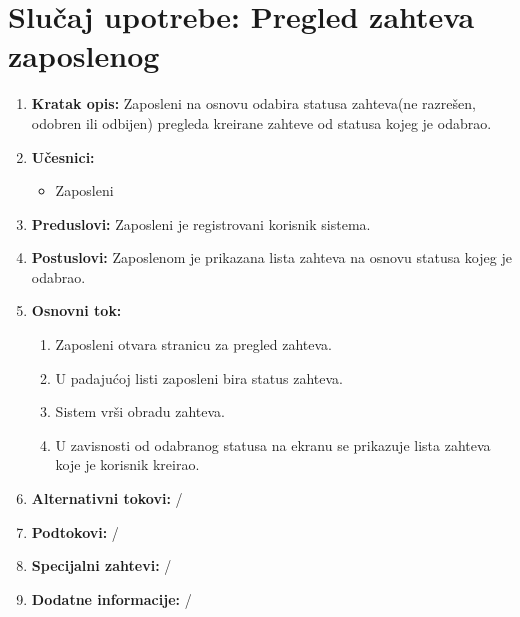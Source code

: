 \documentclass[a4paper]{article}
\begin{document}
\section{Slučaj upotrebe: Pregled zahteva zaposlenog}
\begin{enumerate}
    \item \textbf{Kratak opis:} Zaposleni na osnovu odabira statusa zahteva(ne razrešen, odobren ili odbijen) pregleda kreirane zahteve od statusa kojeg je odabrao.
    \item \textbf{Učesnici:}
        \begin{itemize}
            \item Zaposleni
        \end{itemize}
    \item \textbf{Preduslovi:} Zaposleni je registrovani korisnik sistema.
    \item \textbf{Postuslovi:} Zaposlenom je prikazana lista zahteva na osnovu statusa kojeg je odabrao.
    \item \textbf{Osnovni tok:}
        \begin{enumerate}
            \item Zaposleni otvara stranicu za pregled zahteva.
            \item U padajućoj listi zaposleni bira status zahteva.
            \item Sistem vrši obradu zahteva.
            \item U zavisnosti od odabranog statusa na ekranu se prikazuje lista zahteva koje je korisnik kreirao.
        \end{enumerate}
    \item \textbf{Alternativni tokovi:} /
    \item \textbf{Podtokovi:} /
    \item \textbf{Specijalni zahtevi:} /
    \item \textbf{Dodatne informacije:} /
\end{enumerate}
\end{document}
